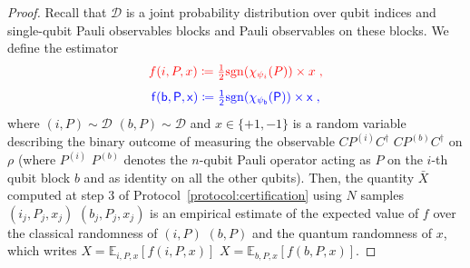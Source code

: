 \documentclass[a4paper,twocolumn,11pt,unpublished]{../../revision/quantumarticle}
\newcommand{\sgn}{\mathrm{sgn}}
\newcommand{\jdist}{\mathcal D} %
\providecommand{\DIFadd}[1]{{\protect\color{blue} \sf #1}} %
\providecommand{\DIFdel}[1]{{\protect\color{red} \scriptsize #1}} %
\providecommand{\DIFaddbegin}{} %
\providecommand{\DIFaddend}{} %
\providecommand{\DIFdelbegin}{} %
\providecommand{\DIFdelend}{} %
\begin{document}
        \begin{proof}
        Recall that $\jdist$ is a joint probability distribution over \DIFdelbegin \DIFdel{qubit indices and single-qubit Pauli observables }\DIFdelend \DIFaddbegin \DIFadd{blocks and Pauli observables on these blocks}\DIFaddend . We define the estimator
        \DIFdelbegin \begin{displaymath}
        \DIFdel{\label{def_f}
            f(i,P,x)\coloneqq \tfrac 1 2 \sgn(\chi_{\psi_i}(P)) \times x\;,
        }\end{displaymath}%
\DIFdelend \DIFaddbegin \begin{equation}
        \DIFadd{\label{def_f}
            f(b,P,x)\coloneqq \tfrac 1 2 \sgn(\chi_{\psi_b}(P)) \times x\;,
        }\end{equation}\DIFaddend 
            where \DIFdelbegin \DIFdel{$(i,P)\sim\mathcal D$ }\DIFdelend \DIFaddbegin \DIFadd{$(b,P)\sim\mathcal D$ }\DIFaddend and $x\in\{+1, -1\}$ is a random variable describing the binary outcome of measuring the observable \DIFdelbegin \DIFdel{$C P^{(i)}C^\dagger$ }\DIFdelend \DIFaddbegin \DIFadd{$C P^{(b)}C^\dagger$ }\DIFaddend on $\rho$ (where \DIFdelbegin \DIFdel{$P^{(i)}$ }\DIFdelend \DIFaddbegin \DIFadd{$P^{(b)}$ }\DIFaddend denotes the $n$-qubit Pauli operator acting as $P$ on \DIFdelbegin \DIFdel{the $i$-th qubit }\DIFdelend \DIFaddbegin \DIFadd{block $b$ }\DIFaddend and as identity on all the other qubits). Then, the quantity $\bar X$ computed at step $3$ of Protocol~\ref{protocol:certification} using $N$ samples \DIFdelbegin \DIFdel{$(i_j,P_j,x_j)$ }\DIFdelend \DIFaddbegin \DIFadd{$(b_j,P_j,x_j)$ }\DIFaddend is an empirical estimate of the expected value of $f$ over the classical randomness of \DIFdelbegin \DIFdel{$(i,P)$ }\DIFdelend \DIFaddbegin \DIFadd{$(b,P)$ }\DIFaddend and the quantum randomness of $x$, which writes \DIFdelbegin \DIFdel{$X=\mathbb E_{i,P,x}[f(i,P,x)]$}\DIFdelend \DIFaddbegin \DIFadd{$X=\mathbb E_{b,P,x}[f(b,P,x)]$}\DIFaddend .


\end{proof}
\end{document}
